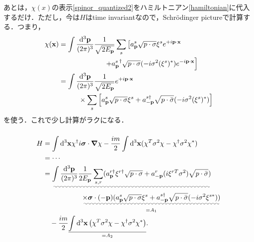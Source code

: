 \documentclass[pdflatex,unicode,ja=standard,12pt]{beamer}
\begin{document}
\begin{frame}%

  \frametitle{\subsecname}

  あとは，$\chi(x)$の表示\eqref{spinor_quantized2}をハミルトニアン\eqref{hamiltonian}に代入するだけ．ただし，今は$H$はtime invariantなので，Schrödinger pictureで計算する．つまり，  
  \begin{align}
    \chi(\mathbf{x})
    &=    
    \int\frac{\dd^3 \mathbf{p}}{(2\pi)^3}
    \frac{1}{\sqrt{2E_{\mathbf{p}}}}
    \sum_s
    \left[  
      a_{\mathbf{p}}^s \sqrt{p\cdot \sigma}\xi^s e^{+i\mathbf{p}\cdot\mathbf{x}}
    \right.
    \nonumber
    \\
    &\hspace{2.3cm}
    \left.
      +
      {a_{\mathbf{p}}^s}^{\dag} \sqrt{p\cdot \sigma}(-i\sigma^2(\xi^s)^{*}) e^{-i\mathbf{p}\cdot\mathbf{x}}
    \right]
    \nonumber
    \\
    &=
    \int\frac{\dd^3 \mathbf{p}}{(2\pi)^3}
    \frac{1}{\sqrt{2E_{\mathbf{p}}}}
    e^{+i\mathbf{p}\cdot\mathbf{x}}
    \nonumber
    \\
    &\hspace{1cm}
    \times
    \sum_s    
    \left[  
      a_{\mathbf{p}}^s\sqrt{p\cdot \sigma}\xi^s
      +
      {a_{-\mathbf{p}}^{s\dag}} \sqrt{p\cdot \bar{\sigma}}(-i\sigma^2(\xi^s)^{*}) 
    \right]
  \end{align}
  を使う．これで少し計算がラクになる．

\end{frame}

\begin{frame}%

  \frametitle{\subsecname}

  \begin{align}
    H
    &=
    \int\dd^3\mathbf{x}
    \chi^{\dag}i\bm{\sigma}\cdot\bm{\nabla}\chi
    -    
    \frac{im}{2}
    \int\dd^3\mathbf{x}
    (\chi^{T}\sigma^{2}\chi-\chi^{\dag}\sigma^2\chi^{*})
    \nonumber
    \\
    &=\cdots
    \nonumber
    \\
    &=
    \uwave{
      \int\frac{\dd^3\mathbf{p}}{(2\pi)^3}
      \frac{1}{2E_{\mathbf{p}}}\sum_{s,r}
      (a_{\mathbf{p}}^{r\dag}\xi^{r\dag}\sqrt{p\cdot\sigma}+a_{-\mathbf{p}}^{r}(i\xi^{rT}\sigma^2)\sqrt{p\cdot\bar{\sigma}})
    }
    \nonumber
    \\
    &\hspace{2cm}
    \underset{=A_1}{
      \uwave{
      \times
      \bm{\sigma}\cdot(-\mathbf{p})
      (a_{\mathbf{p}}^s\sqrt{p\cdot\sigma}\xi^s+a_{-\mathbf{p}}^{s\dag}\sqrt{p\cdot\bar{\sigma}}(-i\sigma^2\xi^{s*}))
      }
    }
    \nonumber
    \\
    &\quad
    -
    \frac{im}{2}
    \underset{=A_2}{
      \uline{
        \int\dd^3\mathbf{x}
        \left(  
          \chi^{T}\sigma^{2}\chi
          -
          \chi^{\dag}\sigma^2\chi^{*}
        \right)
      }
    }
    .
    \nonumber
  \end{align}

\end{frame}
\end{document}
